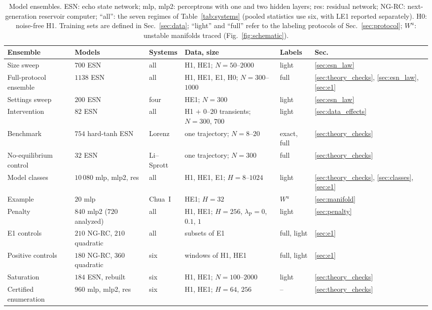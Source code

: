 \begin{table}
\caption{Model ensembles. ESN: echo state network; mlp, mlp2: perceptrons with one and two hidden layers; res: residual
network; NG-RC: next-generation reservoir computer; ``all'': the seven regimes of Table~\ref{tab:systems} (pooled statistics use six, with LE1 reported separately). H0: noise-free H1. Training sets
are defined in Sec.~\ref{sec:data}; ``light'' and ``full'' refer to the labeling protocols of Sec.~\ref{sec:protocol}; $W^u$: unstable manifolds traced
(Fig.~\ref{fig:schematic}).}
\label{tab:ensembles}
\begin{ruledtabular}
\begin{tabular}{llllll}
Ensemble & Models & Systems & Data, size & Labels & Sec. \\
\hline
Size sweep & $700$ ESN & all & H1, HE1; $N=50$--$2000$ & light & \ref{sec:esn_law} \\
Full-protocol ensemble & $1138$ ESN & all & H1, HE1, E1, H0; $N=300$--$1000$ & full & \ref{sec:theory_checks}, \ref{sec:esn_law}, \ref{sec:e1} \\
Settings sweep & $200$ ESN & four & HE1; $N=300$ & light & \ref{sec:esn_law} \\
Intervention & $82$ ESN & all & H1 $+$ $0$--$20$ transients; $N=300$, $700$ & light & \ref{sec:data_effects} \\
Benchmark & $754$ hard-tanh ESN & Lorenz & one trajectory; $N=8$--$20$ & exact, full & \ref{sec:theory_checks} \\
No-equilibrium control & $32$ ESN & Li--Sprott & one trajectory; $N=300$ & full & \ref{sec:theory_checks} \\
Model classes & $10\,080$ mlp, mlp2, res & all & H1, HE1, E1; $H=8$--$1024$ & light & \ref{sec:theory_checks}, \ref{sec:classes}, \ref{sec:e1} \\
Example & $20$ mlp & Chua~I & HE1; $H=32$ & $W^u$ & \ref{sec:manifold} \\
Penalty & $840$ mlp2 ($720$ analyzed) & all & H1, HE1; $H=256$, $\lambda_{\mathrm{P}}=0$, $0.1$, $1$ & light & \ref{sec:penalty} \\
E1 controls & $210$ NG-RC, $210$ quadratic & all & subsets of E1 & full, light & \ref{sec:e1} \\
Positive controls & $180$ NG-RC, $360$ quadratic & six & windows of H1, HE1 & full, light & \ref{sec:e1} \\
Saturation & $184$ ESN, rebuilt & six & H1, HE1; $N=100$--$2000$ & light & \ref{sec:theory_checks} \\
Certified enumeration & $960$ mlp, mlp2, res & six & H1, HE1; $H=64$, $256$ & -- & \ref{sec:theory_checks} \\
\end{tabular}
\end{ruledtabular}
\end{table}
